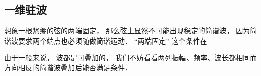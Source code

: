 
\begin{issues}
\issueDraft
\end{issues}


\subsection{一维驻波}
想象一根紧绷的弦的两端固定， 那么弦上显然不可能出现稳定的简谐波， 因为简谐波要求两个端点也必须随做简谐运动． “两端固定” 这个条件在

由于一般来说， 波都是可叠加的， 我们不妨看看两列振幅、频率、波长都相同而方向相反的简谐波叠加后能否满足条件．
